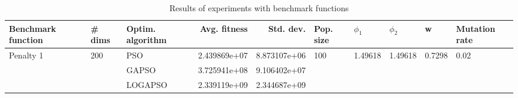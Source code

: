 \begin{table}
\centering
\caption{Results of experiments with benchmark functions}
\begin{tabular}{lllrrlllll}
\toprule
        Benchmark function &              \# dims & Optim. algorithm &  Avg. fitness &    Std. dev. &            Pop. size &               $\phi_{1}$ &               $\phi_{2}$ &                       w &         Mutation rate \\
\midrule
\multirow{3}{*}{Penalty 1} & \multirow{3}{*}{200} &              PSO &  2.439869e+07 & 8.873107e+06 & \multirow{3}{*}{100} & \multirow{3}{*}{1.49618} & \multirow{3}{*}{1.49618} & \multirow{3}{*}{0.7298} & \multirow{3}{*}{0.02} \\
                           &                      &            GAPSO &  3.725941e+08 & 9.106402e+07 &                      &                          &                          &                         &                       \\
                           &                      &          LOGAPSO &  2.339119e+09 & 2.344687e+09 &                      &                          &                          &                         &                       \\
\bottomrule
\end{tabular}
\end{table}
